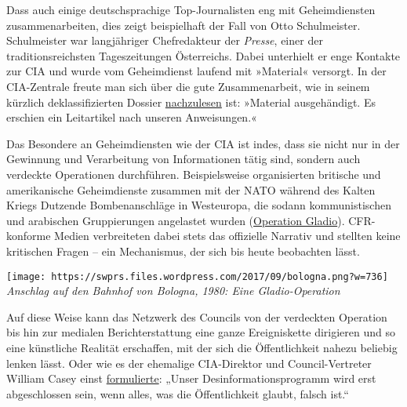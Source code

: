 Dass auch einige deutschsprachige Top-Journalisten eng mit
Geheimdiensten zusammenarbeiten, dies zeigt beispielhaft der Fall von
Otto Schulmeister. Schulmeister war langjähriger Chefredakteur der
\emph{Presse}, einer der traditionsreichsten Tages­zeitungen
Österreichs. Dabei unterhielt er enge Kontakte zur CIA und wurde vom
Geheim­dienst laufend mit »Material« versorgt. In der CIA-Zentrale
freute man sich über die gute Zusammenarbeit, wie in seinem kürzlich
deklassifizierten Dossier
\href{https://swprs.org/der-chefredakteur-und-die-cia}{nachzulesen} ist:
»Material ausgehändigt. Es erschien ein Leitartikel nach unseren
Anweisungen.«

Das Besondere an Geheimdiensten wie der CIA ist indes, dass sie nicht
nur in der Gewinnung und Verarbeitung von Informationen tätig sind,
sondern auch verdeckte Operationen durchführen. Beispiels­weise
organisierten britische und amerikanische Geheimdienste zusammen mit der
NATO während des Kalten Kriegs Dutzende Bombenanschläge in Westeuropa,
die sodann kommunistischen und arabischen Gruppierungen angelastet
wurden
(\href{https://web.archive.org/web/20190214075435/https://www.danieleganser.ch/assets/files/Inhalte/Publikationen/Fachzeitschriften/DanieleGanser_Terrorism_in_Western_Europe.pdf}{Operation
Gladio}). CFR-konforme Medien verbreiteten dabei stets das offizielle
Narrativ und stellten keine kritischen Fragen -- ein Mechanismus, der
sich bis heute beobachten lässt.

\texttt{[image: https://swprs.files.wordpress.com/2017/09/bologna.png?w=736]}\\
\emph{Anschlag auf den Bahnhof von Bologna, 1980: Eine Gladio-Operation}

Auf diese Weise kann das Netzwerk des Councils von der verdeckten
Operation bis hin zur medialen Bericht­erstattung eine ganze
Ereigniskette dirigieren und so eine künstliche Realität erschaffen, mit
der sich die Öffentlich­keit nahezu beliebig lenken lässt. Oder wie es
der ehemalige CIA-Direktor und Council-Vertreter William Casey einst
\href{https://www.quora.com/Did-CIA-Director-William-Casey-really-say-Well-know-our-disinformation-program-is-complete-when-everything-the-American-public-believes-is-false/answer/Barbara-Honegger}{formulierte}:
„Unser Desinformations­programm wird erst abgeschlossen sein, wenn
alles, was die Öffentlich­keit glaubt, falsch ist.``

